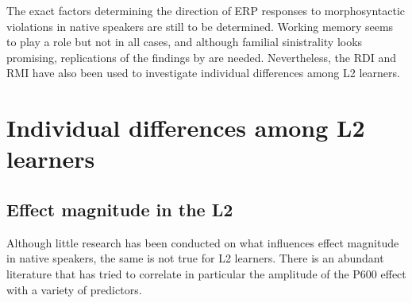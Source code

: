 \documentclass[output=paper,colorlinks,citecolor=brown,modfonts,nonflat]{../langscibook}
\begin{document}
The exact factors determining the direction of ERP responses to morphosyntactic violations in native speakers are still to be determined. Working memory seems to play a role but not in all cases, and although familial sinistrality looks promising, replications of the findings by \citet{GreyEtAl2017} are needed. Nevertheless, the RDI and RMI have also been used to investigate individual differences among L2 learners. 

\section{Individual differences among L2 learners}
\subsection{Effect magnitude in the L2}

Although little research has been conducted on what influences effect magnitude in native speakers, the same is not true for L2 learners. There is an abundant literature that has tried to correlate in particular the amplitude of the P600 effect with a variety of predictors.
\end{document}
